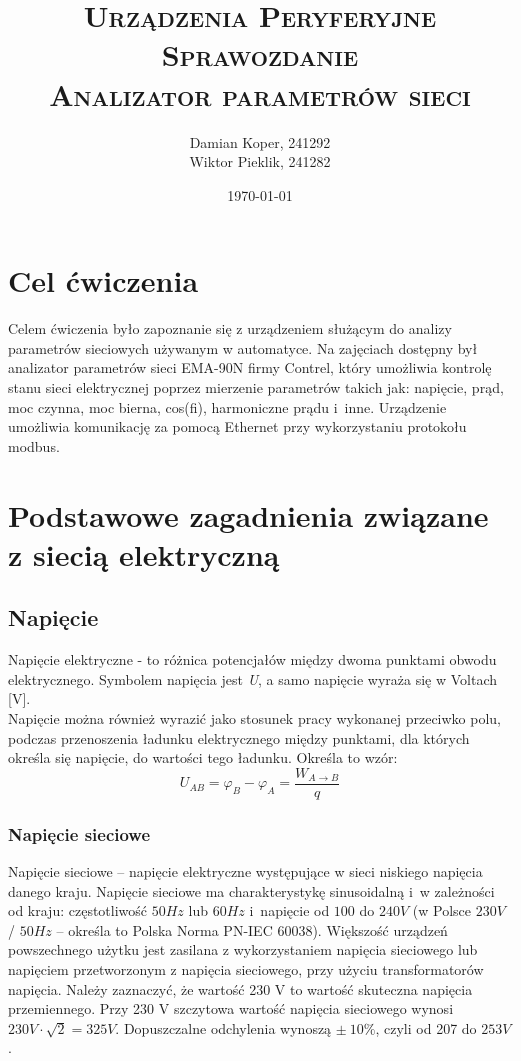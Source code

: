 \documentclass[12pt]{article}
\title{ 
    \vspace*{55mm}
    \textsc{
        \textbf{Urządzenia Peryferyjne}\\
        \large Sprawozdanie  \\
        \Large Analizator parametrów sieci
        }
}
\author{
Damian Koper,  241292\\
Wiktor Pieklik, 241282\\
}
\date{\today}
\begin{document}
\maketitle


\newpage
\setcounter{tocdepth}{2}
\localtableofcontents
\listoffigures
\lstlistoflistings

\newpage

\section{Cel ćwiczenia}
Celem ćwiczenia było zapoznanie się z urządzeniem służącym do analizy parametrów sieciowych używanym w automatyce. Na zajęciach dostępny był analizator parametrów sieci EMA-90N firmy Contrel, który umożliwia kontrolę stanu sieci elektrycznej poprzez mierzenie parametrów takich jak: napięcie, prąd, moc czynna, moc bierna, cos(fi), harmoniczne prądu i~inne. Urządzenie umożliwia komunikację za pomocą Ethernet przy wykorzystaniu protokołu modbus.
\section{Podstawowe zagadnienia związane z siecią elektryczną}
\subsection{Napięcie}
Napięcie elektryczne - to różnica potencjałów między dwoma punktami obwodu elektrycznego. Symbolem napięcia jest \textit{U}, a samo napięcie wyraża się w Voltach [V].\\
Napięcie można również wyrazić jako stosunek pracy wykonanej przeciwko polu, podczas przenoszenia ładunku elektrycznego między punktami, dla których określa się napięcie, do wartości tego ładunku. Określa to wzór:\\
\begin{equation}
    U_{AB} = \varphi_B - \varphi_A = \frac{W_{A \rightarrow B}}{q}
\end{equation}
\subsubsection{Napięcie sieciowe}
Napięcie sieciowe – napięcie elektryczne występujące w sieci niskiego napięcia danego kraju. Napięcie sieciowe ma charakterystykę sinusoidalną i~w zależności od kraju: częstotliwość $50Hz$ lub $60Hz$ i~napięcie od $100$ do $240V$ (w Polsce $230 V$ / $50Hz$ – określa to Polska Norma PN-IEC 60038). Większość urządzeń powszechnego użytku jest zasilana z wykorzystaniem napięcia sieciowego lub napięciem przetworzonym z napięcia sieciowego, przy użyciu transformatorów napięcia. Należy zaznaczyć, że wartość 230 V to wartość skuteczna napięcia przemiennego. Przy 230 V szczytowa wartość napięcia sieciowego wynosi $230 V \cdot \sqrt{2} = 325 V$. Dopuszczalne odchylenia wynoszą $\pm\ 10\%$, czyli od 207 do $253 V$.
\end{document}
